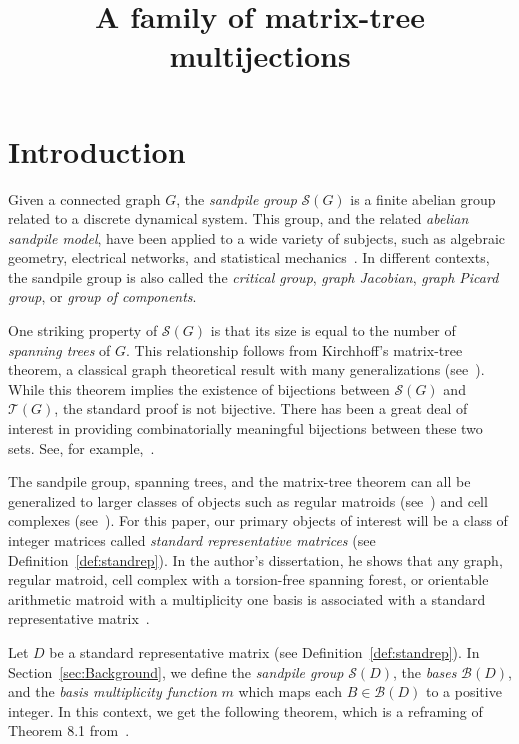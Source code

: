 \documentclass[ALCO,ThmDefs,Unicode,epreuves]{cedram}
\author{\firstname{Alex} \lastname{McDonough}}
\title{A family of matrix-tree multijections}
\newcommand{\B}{\mathcal{B}}
\newcommand{\Sand}{\mathcal{S}}
\begin{document}
\maketitle

\section{Introduction}

Given a connected graph $G$, the \emph{sandpile group} $\Sand(G)$ is a finite abelian group related to a discrete dynamical system. This group, and the related \emph{abelian sandpile model}, have been applied to a wide variety of subjects, such as algebraic geometry, electrical networks, and statistical mechanics~\cite{BTW,Electric,Lorenzini}. In different contexts, the sandpile group is also called the \emph{critical group}, \emph{graph Jacobian}, \emph{graph Picard group}, or \emph{group of components}. 

One striking property of $\Sand(G)$ is that its size is equal to the number of \emph{spanning trees} of $G$. This relationship follows from Kirchhoff's matrix-tree theorem, a classical graph theoretical result with many generalizations (see~\cite{Seth}). While this theorem implies the existence of bijections between $\Sand(G)$ and $\mathcal T(G)$, the standard proof is not bijective. There has been a great deal of interest in providing combinatorially meaningful bijections between these two sets. See, for example,~\cite{Bernardi,BigWink,Holroyd,Dhar92}.

The sandpile group, spanning trees, and the matrix-tree theorem can all be generalized to larger classes of objects such as regular matroids (see~\cite{Gioan2,Gioan,Merino}) and cell complexes (see~\cite{Simp,Crit,CutsFlows}). For this paper, our primary objects of interest will be a class of integer matrices called \emph{standard representative matrices} (see Definition~\ref{def:standrep}). In the author's dissertation, he shows that any graph, regular matroid, cell complex with a torsion-free spanning forest, or orientable arithmetic matroid with a multiplicity one basis is associated with a standard representative matrix~\cite{mythesis}. 

Let $D$ be a standard representative matrix (see Definition~\ref{def:standrep}). In Section~\ref{sec:Background}, we define the \emph{sandpile group} $\Sand(D)$, the \emph{bases} $\B(D)$, and the \emph{basis multiplicity function} $m$ which maps each $B \in \B(D)$ to a positive integer. In this context, we get the following theorem, which is a reframing of Theorem 8.1 from~\cite{CutsFlows}.
\end{document}
